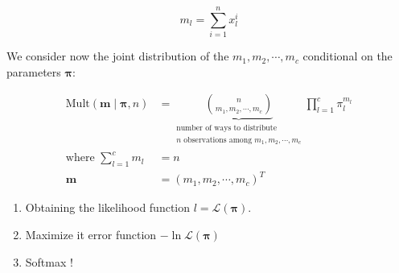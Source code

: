 \begin{equation}
  m_l = \sum_{i=1}^n x_l^i \tag{number of observations of class $l$ in data}
\end{equation}

We consider now the joint distribution of the $m_1, m_2, \cdots, m_c$ conditional on the
parameters $\boldsymbol\pi$:

\begin{align*}
  \text{Mult}(\boldsymbol{m} \mid \boldsymbol\pi, n) &=
\underbrace{\binom{n}{m_1, m_2, \cdots, m_c}}_{\substack{\text{number of ways to distribute} \\ \text{$n$ observations among $m_1, m_2, \cdots, m_c$}}}
        \prod_{l=1}^c \pi_l^{m_l} \\
    \text{where } \sum_{l=1}^c m_l &= n \\
    \boldsymbol{m} &= (m_1, m_2, \cdots, m_c)^T
\end{align*}


\begin{enumerate}
  \item Obtaining the likelihood function $l = \mathcal{L}(\boldsymbol\pi)$.
  \item Maximize it \textrightarrow{} error function $- \ln \mathcal{L}(\boldsymbol\pi)$
  \item Softmax !
\end{enumerate}

